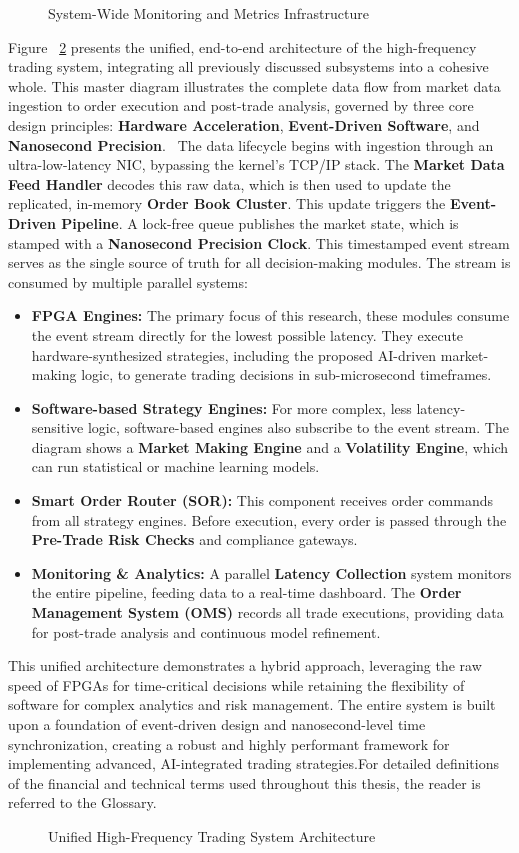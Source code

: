 \begin{figure}
    \centering
    
    \caption{System-Wide Monitoring and Metrics Infrastructure} 
    \label{fig:monitoring_metrics}
\end{figure}

Figure ~\ref{fig:unified_architecture} presents the unified, end-to-end architecture of the high-frequency trading system, integrating all previously discussed subsystems into a cohesive whole. This master diagram illustrates the complete data flow from market data ingestion to order execution and post-trade analysis, governed by three core design principles: \textbf{Hardware Acceleration}, \textbf{Event-Driven Software}, and \textbf{Nanosecond Precision}. \datamethodology\ The data lifecycle begins with ingestion through an ultra-low-latency NIC, bypassing the kernel's TCP/IP stack. The \textbf{Market Data Feed Handler} decodes this raw data, which is then used to update the replicated, in-memory \textbf{Order Book Cluster}. This update triggers the \textbf{Event-Driven Pipeline}. A lock-free queue publishes the market state, which is stamped with a \textbf{Nanosecond Precision Clock}. This timestamped event stream serves as the single source of truth for all decision-making modules. The stream is consumed by multiple parallel systems: \begin{itemize} 
    \item \textbf{FPGA Engines:} The primary focus of this research, these modules consume the event stream directly for the lowest possible latency. They execute hardware-synthesized strategies, including the proposed AI-driven market-making logic, to generate trading decisions in sub-microsecond timeframes. 
    \item \textbf{Software-based Strategy Engines:} For more complex, less latency-sensitive logic, software-based engines also subscribe to the event stream. The diagram shows a \textbf{Market Making Engine} and a \textbf{Volatility Engine}, which can run statistical or machine learning models. 
    \item \textbf{Smart Order Router (SOR):} This component receives order commands from all strategy engines. Before execution, every order is passed through the \textbf{Pre-Trade Risk Checks} and compliance gateways. 
    \item \textbf{Monitoring \& Analytics:} A parallel \textbf{Latency Collection} system monitors the entire pipeline, feeding data to a real-time dashboard. The \textbf{Order Management System (OMS)} records all trade executions, providing data for post-trade analysis and continuous model refinement. 
\end{itemize} This unified architecture demonstrates a hybrid approach, leveraging the raw speed of FPGAs for time-critical decisions while retaining the flexibility of software for complex analytics and risk management. The entire system is built upon a foundation of event-driven design and nanosecond-level time synchronization, creating a robust and highly performant framework for implementing advanced, AI-integrated trading strategies.For detailed definitions of the financial and technical terms used throughout this thesis, the reader is referred to the Glossary.

\begin{figure}
    \centering
    
    \caption{Unified High-Frequency Trading System Architecture}
    \label{fig:unified_architecture}
\end{figure}
